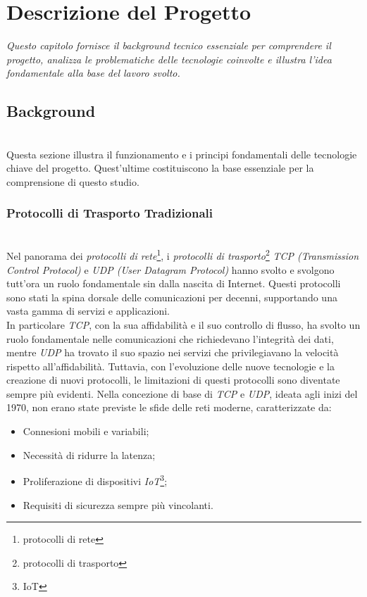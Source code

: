 \chapter{Descrizione del Progetto}
\label{cap:descrizione}

\textit{\indent Questo capitolo fornisce il background tecnico essenziale per comprendere il progetto, analizza le problematiche delle tecnologie coinvolte e illustra l'idea fondamentale alla base del lavoro svolto.}

\section{Background}

~\\
\indent Questa sezione illustra il funzionamento e i principi fondamentali delle tecnologie chiave del progetto.
Quest'ultime costituiscono la base essenziale per la comprensione di questo studio. 

\subsection{Protocolli di Trasporto Tradizionali}
~\\
\indent Nel panorama dei \emph{protocolli di rete}\footnote{\gls{protocolli di rete}}, i \emph{protocolli di trasporto}\footnote{\gls{protocolli di trasporto}} \emph{TCP (Transmission Control Protocol)}  e \emph{UDP (User Datagram Protocol)} hanno svolto e svolgono tutt'ora un ruolo fondamentale sin dalla nascita di Internet.
Questi protocolli sono stati la spina dorsale delle comunicazioni per decenni, supportando una vasta gamma di servizi e applicazioni.\\
In particolare \emph{TCP}, con la sua affidabilità e il suo controllo di flusso, ha svolto un ruolo fondamentale nelle comunicazioni che richiedevano l'integrità dei dati, mentre \emph{UDP} ha trovato il suo spazio nei servizi che privilegiavano la velocità rispetto all'affidabilità. 
Tuttavia, con l'evoluzione delle nuove tecnologie e la creazione di nuovi protocolli, le limitazioni di questi protocolli sono diventate sempre più evidenti. Nella concezione di base di \emph{TCP} e \emph{UDP}, ideata agli inizi del 1970, non erano state previste le sfide delle reti moderne, 
caratterizzate da:  
\begin{itemize}
    \item Connesioni mobili e variabili;
    
    \item Necessità di ridurre la latenza;
    
    \item Proliferazione di dispositivi \emph{IoT}\footnote{\gls{IoT}};
     
    \item Requisiti di sicurezza sempre più vincolanti.
\end{itemize}

